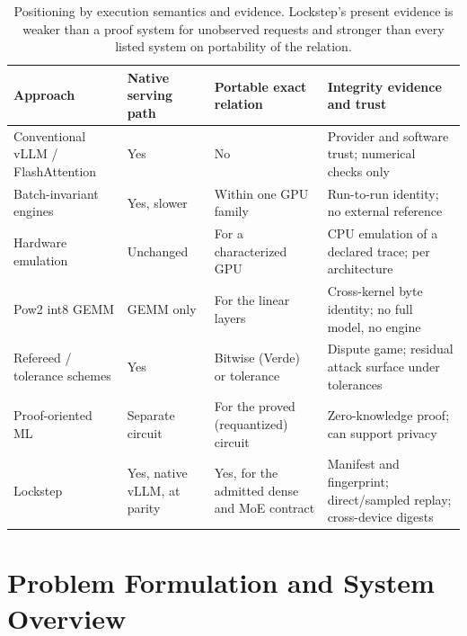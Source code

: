 \documentclass{article}
\begin{document}
\begin{table}[ht]
\centering
\small
\begin{tabular}{
  >{\raggedright\arraybackslash}p{}
  >{\raggedright\arraybackslash}p{}
  >{\raggedright\arraybackslash}p{}
  >{\raggedright\arraybackslash}p{}}
\toprule
Approach & Native serving path & Portable exact relation & Integrity evidence and trust \\
\midrule
Conventional vLLM / FlashAttention & Yes & No & Provider and software trust; numerical checks only \\
\addlinespace[0.4em]
Batch-invariant engines \cite{he2025nondeterminism,eigenai2026} & Yes, slower & Within one GPU family & Run-to-run identity; no external reference \\
\addlinespace[0.4em]
Hardware emulation \cite{badash2026hawkeye,cankaya2026bitexact} & Unchanged & For a characterized GPU & CPU emulation of a declared trace; per architecture \\
\addlinespace[0.4em]
Pow2 int8 GEMM \cite{chen2026pow2} & GEMM only & For the linear layers & Cross-kernel byte identity; no full model, no engine \\
\addlinespace[0.4em]
Refereed / tolerance schemes \cite{verde2025,tao2025} & Yes & Bitwise (Verde) or tolerance & Dispute game; residual attack surface under tolerances \\
\addlinespace[0.4em]
Proof-oriented ML \cite{sun2024zkllm,deepprove2026} & Separate circuit & For the proved (requantized) circuit & Zero-knowledge proof; can support privacy \\
\addlinespace[0.6em]
Lockstep & Yes, native vLLM, at parity & Yes, for the admitted dense and MoE contract & Manifest and fingerprint; direct/sampled replay; cross-device digests \\
\bottomrule
\end{tabular}
\caption{Positioning by execution semantics and evidence.  Lockstep's present evidence is
weaker than a proof system for unobserved requests and stronger than every listed system on
portability of the relation.}
\label{tab:approaches}
\end{table}
\FloatBarrier

\section{Problem Formulation and System Overview}
\label{sec:overview}
\end{document}

